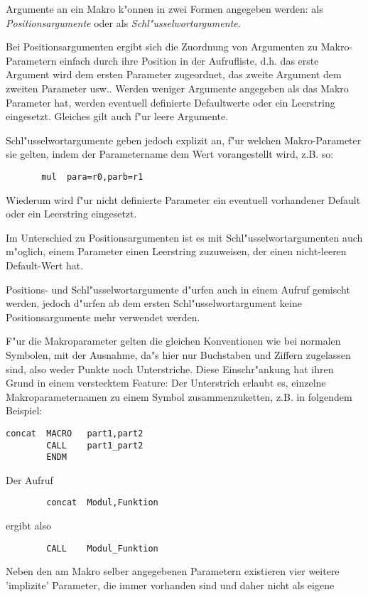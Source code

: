 \documentclass[12pt,a4paper,twoside]{report}
\begin{document}
Argumente an ein Makro k"onnen in zwei Formen angegeben werden:
als {\em Positionsargumente} oder als {\em
Schl"usselwortargumente}.
\par
Bei Positionsargumenten ergibt sich
die Zuordnung von Argumenten zu Makro-Parametern einfach durch
ihre Position in der Aufrufliste, d.h. das erste Argument wird dem
ersten Parameter zugeordnet, das zweite Argument dem zweiten
Parameter usw..  Werden weniger Argumente angegeben als das Makro
Parameter hat, werden eventuell definierte Defaultwerte oder ein
Leerstring eingesetzt.  Gleiches gilt auch f"ur leere Argumente.
\par
Schl"usselwortargumente geben jedoch explizit an, f"ur welchen
Makro-Parameter sie gelten, indem der Parametername dem Wert
vorangestellt wird, z.B. so:
\begin{verbatim}
       mul  para=r0,parb=r1
\end{verbatim}
Wiederum wird f"ur nicht definierte Parameter ein eventuell
vorhandener Default oder ein Leerstring eingesetzt.
\par
Im Unterschied zu Positionsargumenten ist es mit
Schl"usselwortargumenten auch m"oglich, einem Parameter einen
Leerstring zuzuweisen, der einen nicht-leeren Default-Wert hat.
\par
Positions- und Schl"usselwortargumente d"urfen auch in einem
Aufruf gemischt werden, jedoch d"urfen ab dem ersten
Schl"usselwortargument keine Positionsargumente mehr verwendet
werden.
\par
F"ur die Makroparameter gelten die gleichen Konventionen wie bei
normalen Symbolen, mit der Ausnahme, da"s hier nur Buchstaben
und Ziffern zugelassen sind, also weder Punkte noch
Unterstriche. Diese Einschr"ankung hat ihren Grund in einem
verstecktem Feature: Der Unterstrich erlaubt es, einzelne
Makroparameternamen zu einem Symbol zusammenzuketten, z.B. in
folgendem Beispiel:
\begin{verbatim}
concat  MACRO   part1,part2
        CALL    part1_part2
        ENDM
\end{verbatim}
Der Aufruf
\begin{verbatim}
        concat  Modul,Funktion
\end{verbatim}
ergibt also
\begin{verbatim}
        CALL    Modul_Funktion
\end{verbatim}
\par
Neben den am Makro selber angegebenen Parametern existieren vier weitere
'implizite' Parameter, die immer vorhanden sind und daher nicht als eigene
\end{document}
